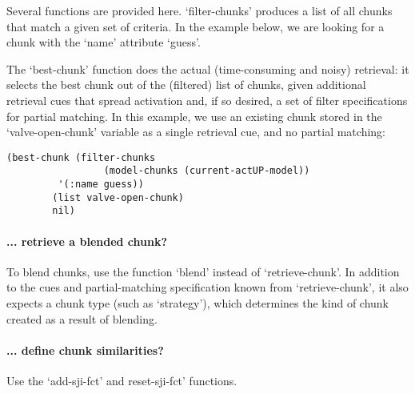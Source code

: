 \documentclass{article}
\begin{document}
Several functions are provided here.  `filter-chunks' produces a list of all chunks that match a given set of
criteria.  In the example below, we are looking for a chunk with the `name' attribute `guess'.

The `best-chunk' function does the actual (time-consuming and noisy) retrieval: it selects the best chunk out of the (filtered) list of chunks, given additional retrieval cues that spread activation and, if so desired, a set of filter specifications for partial matching.  In this example, we use an existing chunk stored in the `valve-open-chunk' variable as a single retrieval cue, and no partial matching:

\begin{verbatim}
(best-chunk (filter-chunks 
                 (model-chunks (current-actUP-model))
		 '(:name guess))
	    (list valve-open-chunk) 
	    nil)
\end{verbatim}



\paragraph {... retrieve a blended chunk?}

To blend chunks, use the function `blend' instead of `retrieve-chunk'.
In addition to the cues and partial-matching specification known from `retrieve-chunk', it also expects a chunk type (such as `strategy'), which determines the kind of chunk created as a result of blending.




\paragraph {... define chunk similarities?}

Use the `add-sji-fct' and reset-sji-fct' functions.
\end{document}
